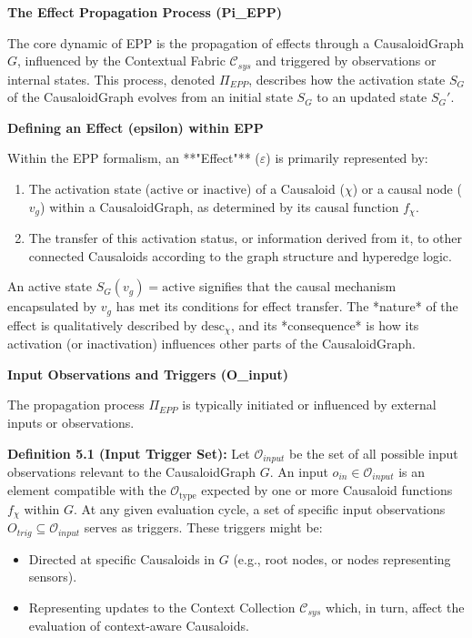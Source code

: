 \textbf{The Effect Propagation Process (Pi\_EPP)}


The core dynamic of EPP is the propagation of effects through a CausaloidGraph \(G\), influenced by the Contextual Fabric \(\mathcal{C}_{sys}\) and triggered by observations or internal states. This process, denoted \(\Pi_{EPP}\), describes how the activation state \(S_G\) of the CausaloidGraph evolves from an initial state \(S_G\) to an updated state \(S_G'\).


\textbf{Defining an Effect (epsilon) within EPP}
    
    Within the EPP formalism, an **"Effect"** (\(\varepsilon\)) is primarily represented by:
    \begin{enumerate}
        \item The activation state (\(\text{active}\) or \(\text{inactive}\)) of a Causaloid (\(\chi\)) or a causal node (\(v_g\)) within a CausaloidGraph, as determined by its causal function \(f_\chi\).
        \item The transfer of this activation status, or information derived from it, to other connected Causaloids according to the graph structure and hyperedge logic.
    \end{enumerate}
    An active state \(S_G(v_g) = \text{active}\) signifies that the causal mechanism encapsulated by \(v_g\) has met its conditions for effect transfer. The *nature* of the effect is qualitatively described by \(\text{desc}_\chi\), and its *consequence* is how its activation (or inactivation) influences other parts of the CausaloidGraph.

    
\textbf{Input Observations and Triggers (O\_input)}
    
    The propagation process \(\Pi_{EPP}\) is typically initiated or influenced by external inputs or observations.
    
    \textbf{Definition 5.1 (Input Trigger Set):} Let \(\mathcal{O}_{input}\) be the set of all possible input observations relevant to the CausaloidGraph \(G\). An input \(o_{in} \in \mathcal{O}_{input}\) is an element compatible with the \(\mathcal{O}_{\text{type}}\) expected by one or more Causaloid functions \(f_\chi\) within \(G\). 
    At any given evaluation cycle, a set of specific input observations \(O_{trig} \subseteq \mathcal{O}_{input}\) serves as triggers. These triggers might be:
    \begin{itemize}
        \item Directed at specific Causaloids in \(G\) (e.g., root nodes, or nodes representing sensors).
        \item Representing updates to the Context Collection \(\mathcal{C}_{sys}\) which, in turn, affect the evaluation of context-aware Causaloids.
    \end{itemize}

